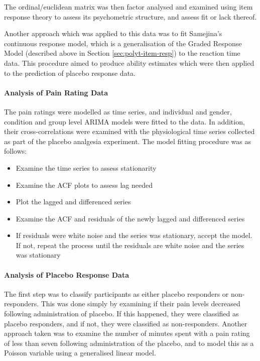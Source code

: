 The ordinal/euclidean matrix was then factor analysed and examined using item response theory to assess its psychometric structure, and assess fit or lack thereof.

Another approach which was applied to this data was to fit Samejina's continuous response model, which is a generalisation of the Graded Response Model (described above in Section \ref{sec:polyt-item-resp}) to the reaction time data. This procedure aimed to produce ability estimates which were then applied to the prediction of placebo response data. 

\paragraph{Analysis of Pain Rating Data}
\label{sec:analysis-pain-rating}

The pain ratings were modelled as time series, and individual and gender, condition and group level ARIMA models were fitted to the data. In addition, their cross-correlations were examined with the physiological time series collected as part of the placebo analgesia experiment. The model fitting procedure was as follows:
\begin{itemize}
\item Examine the time series to assess stationarity

\item Examine the ACF plots to assess lag needed

\item Plot the lagged and differenced series


\item Examine the ACF and residuals of the newly lagged and differenced series

\item If residuals were white noise and the series was stationary, accept the model. If not, repeat the process until the residuals are white noise and the series was  stationary
\end{itemize}

\paragraph{Analysis of Placebo Response Data}
\label{sec:analys-plac-resp}

The first step was to classify participants as either placebo responders or non-responders. This was done simply by examining if their pain levels decreased following administration of placebo. If this happened, they were classified as placebo responders, and if not, they were classified as non-responders. Another approach taken was to examine the number of minutes spent with a pain rating of less than seven following administration of the placebo, and to model this as a Poisson variable using a generalised linear model. 

